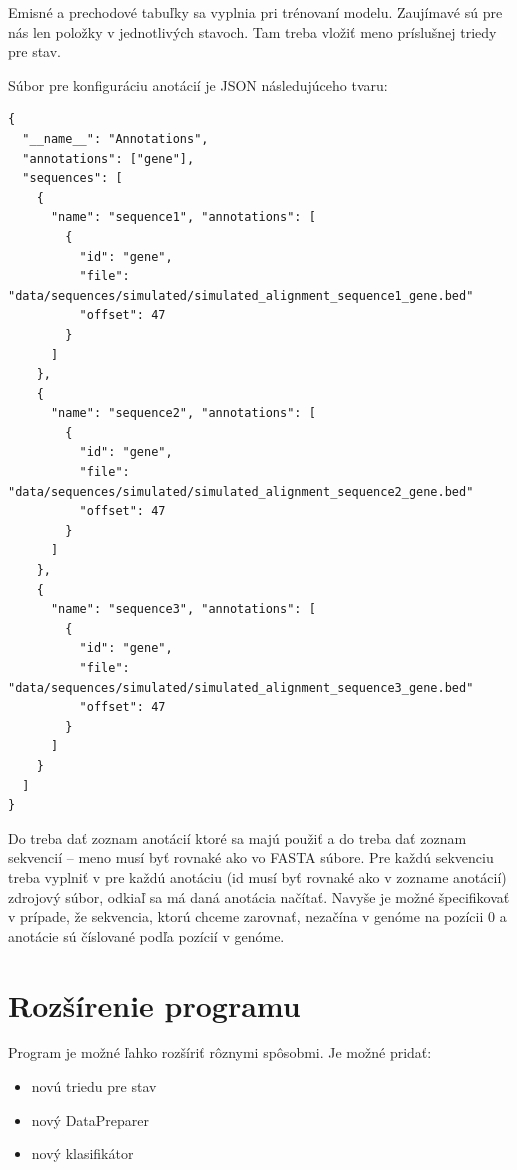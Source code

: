 

Emisné a prechodové tabuľky sa vyplnia pri trénovaní modelu. Zaujímavé sú pre nás len položky  v jednotlivých stavoch. Tam treba vložiť meno príslušnej triedy pre stav.

Súbor pre konfiguráciu anotácií je JSON následujúceho tvaru:
\begin{lstlisting}
{
  "__name__": "Annotations",
  "annotations": ["gene"],
  "sequences": [
    {
      "name": "sequence1", "annotations": [
        {
          "id": "gene",
          "file": "data/sequences/simulated/simulated_alignment_sequence1_gene.bed"
          "offset": 47
        }
      ]
    },
    {
      "name": "sequence2", "annotations": [
        {
          "id": "gene",
          "file": "data/sequences/simulated/simulated_alignment_sequence2_gene.bed"
          "offset": 47
        }
      ]
    },
    {
      "name": "sequence3", "annotations": [
        {
          "id": "gene",
          "file": "data/sequences/simulated/simulated_alignment_sequence3_gene.bed"
          "offset": 47
        }
      ]
    }
  ]
}
\end{lstlisting}
Do  treba dať zoznam anotácií ktoré sa majú použiť a do  treba dať zoznam sekvencií -- meno musí byť rovnaké ako vo FASTA súbore. Pre každú sekvenciu treba vyplniť v  pre každú anotáciu (id musí byť rovnaké ako v zozname anotácií) zdrojový súbor, odkiaľ sa má daná anotácia načítať. Navyše je možné špecifikovať  v prípade, že sekvencia, ktorú chceme zarovnať, nezačína v genóme na pozícii 0 a anotácie sú číslované podľa pozícií v genóme.

\section{Rozšírenie programu}

Program je možné ľahko rozšíriť rôznymi spôsobmi. Je možné pridať:
\begin{itemize}
    \item novú triedu pre stav
    \item nový DataPreparer
    \item nový klasifikátor
\end{itemize}

